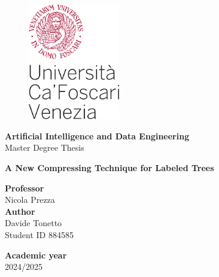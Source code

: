 \begin{titlepage}
\begin{figure}[!htb]
    \includegraphics[width=4cm]{Immagini/logo 2 unive.png}
\end{figure}

\begin{center}
    \vspace{13mm}
    \normalsize{\textbf{Artificial Intelligence and Data Engineering}}
    \vspace{13mm}
    \\ \normalsize{Master Degree Thesis}
\end{center}

\vspace{10mm}
\begin{center}
    \LARGE{\textbf{A New Compressing Technique for Labeled Trees}}
\end{center}

\vspace*{\fill}

\begin{minipage}[t]{1\textwidth}
    {\normalsize{\textbf{Professor}}{\normalsize\vspace{1mm}
    \\ \normalsize{Nicola Prezza }}} \\ 
        
    {\normalsize{\textbf{Author}}{\normalsize\vspace{1mm}
    \\ \normalsize{Davide Tonetto}\\
    \normalsize{Student ID 884585 }}} \\
\end{minipage}

\begin{flushleft}
    {\normalsize{\textbf{Academic year}}{\normalsize\vspace{1mm}
    \\ \normalsize{2024/2025}}}  
\end{flushleft}

\end{titlepage}
